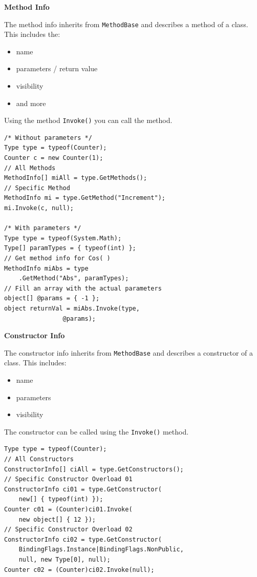 \documentclass[11pt,twoside,landscape]{article}
\begin{document}
\begin{multicols}{3}
\textbf{Method Info}

The method info inherits from \texttt{MethodBase} and describes a method of a class.
This includes the:
\begin{itemize}
\item name
\item parameters / return value
\item visibility
\item and more
\end{itemize}


Using the method \texttt{Invoke()} you can call the method.

\lstset{language=csharp,label= ,caption= ,captionpos=b,numbers=none}
\begin{lstlisting}
/* Without parameters */
Type type = typeof(Counter);
Counter c = new Counter(1);
// All Methods
MethodInfo[] miAll = type.GetMethods();
// Specific Method
MethodInfo mi = type.GetMethod("Increment");
mi.Invoke(c, null);

/* With parameters */
Type type = typeof(System.Math);
Type[] paramTypes = { typeof(int) };
// Get method info for Cos( )
MethodInfo miAbs = type
    .GetMethod("Abs", paramTypes);
// Fill an array with the actual parameters
object[] @params = { -1 };
object returnVal = miAbs.Invoke(type,
				@params);
\end{lstlisting}

\textbf{Constructor Info}

The constructor info inherits from \texttt{MethodBase} and describes a constructor of a class.
This includes:
\begin{itemize}
\item name
\item parameters
\item visibility
\end{itemize}


The constructor can be called using the \texttt{Invoke()} method.

\lstset{language=csharp,label= ,caption= ,captionpos=b,numbers=none}
\begin{lstlisting}
Type type = typeof(Counter);
// All Constructors
ConstructorInfo[] ciAll = type.GetConstructors();
// Specific Constructor Overload 01
ConstructorInfo ci01 = type.GetConstructor(
    new[] { typeof(int) });
Counter c01 = (Counter)ci01.Invoke(
    new object[] { 12 });
// Specific Constructor Overload 02
ConstructorInfo ci02 = type.GetConstructor(
    BindingFlags.Instance|BindingFlags.NonPublic,
    null, new Type[0], null);
Counter c02 = (Counter)ci02.Invoke(null);


\end{lstlisting}
\end{multicols}
\end{document}
